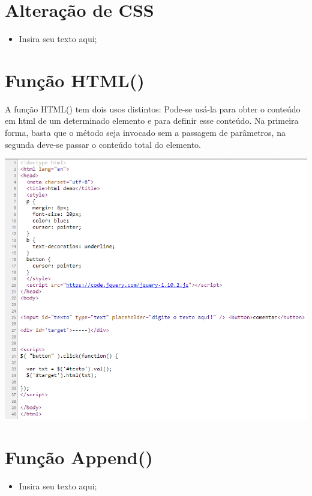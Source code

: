 \documentclass[12pt,a4paper]{article}
\begin{document}
\section{Alteração de CSS}%
\begin{itemize}

\item Insira seu texto aqui;
\end{itemize}

\section{Função HTML()}%

A função HTML() tem dois usos distintos: Pode-se usá-la para obter o conteúdo em html de um determinado elemento e para definir esse conteúdo. Na primeira forma, basta que o método seja invocado sem a passagem de parâmetros, na segunda deve-se passar o conteúdo total do elemento. \vspace{0.5cm}

\hspace{-0.7 cm}
\includegraphics[width=15cm\textwidth]{html.png}

\section{Função Append()}%
\begin{itemize}

\item Insira seu texto aqui;
\end{itemize}
\end{document}
